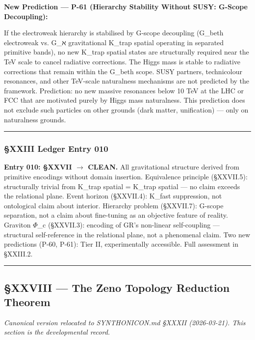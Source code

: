 \documentclass[12pt,a4paper]{article}
\begin{document}
\textbf{New Prediction --- P-61 (Hierarchy Stability Without SUSY: G-Scope Decoupling):}

If the electroweak hierarchy is stabilised by G-scope decoupling (G\_beth electroweak vs. G\_ℵ gravitational K\_trap spatial operating in separated primitive bands), no new K\_trap spatial states are structurally required near the TeV scale to cancel radiative corrections. The Higgs mass is stable to radiative corrections that remain within the G\_beth scope. SUSY partners, technicolour resonances, and other TeV-scale naturalness mechanisms are not predicted by the framework. Prediction: no new massive resonances below 10 TeV at the LHC or FCC that are motivated purely by Higgs mass naturalness. This prediction does not exclude such particles on other grounds (dark matter, unification) --- only on naturalness grounds.

\begin{center}
\rule{0.5\textwidth}{0.4pt}
\end{center}

\subsubsection{§XXIII Ledger Entry 010}

\textbf{Entry 010: §XXVII $\rightarrow$ CLEAN.} All gravitational structure derived from primitive encodings without domain insertion. Equivalence principle (§XXVII.5): structurally trivial from K\_trap spatial = K\_trap spatial --- no claim exceeds the relational plane. Event horizon (§XXVII.4): K\_fast suppression, not ontological claim about interior. Hierarchy problem (§XXVII.7): G-scope separation, not a claim about fine-tuning as an objective feature of reality. Graviton $\Phi$\_c (§XXVII.3): encoding of GR's non-linear self-coupling --- structural self-reference in the relational plane, not a phenomenal claim. Two new predictions (P-60, P-61): Tier II, experimentally accessible. Full assessment in §XXIII.2.

\begin{center}
\rule{0.5\textwidth}{0.4pt}
\end{center}

\subsection{§XXVIII --- The Zeno Topology Reduction Theorem}

\emph{Canonical version relocated to SYNTHONICON.md §XXXII (2026-03-21). This section is the developmental record.}
\end{document}
